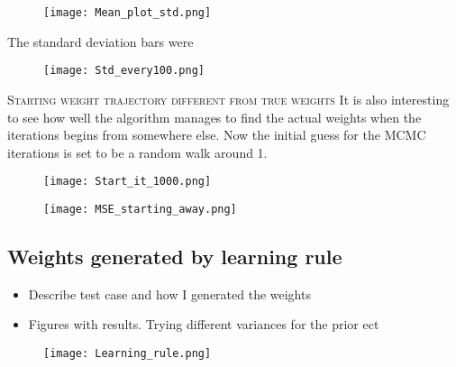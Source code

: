 \begin{figure}[hbt!]
    \centering
    \texttt{[image: Mean\_plot\_std.png]}
\end{figure}

The standard deviation bars were 

\begin{figure}[hbt!]
    \centering
    \texttt{[image: Std\_every100.png]}
\end{figure}

\textsc{Starting weight trajectory different from true weights}
It is also interesting to see how well the algorithm manages to find the actual weights when the iterations begins from somewhere else. Now the initial guess for the MCMC iterations is set to be a random walk around 1.

\begin{figure}[hbt!]
    \centering
    \texttt{[image: Start\_it\_1000.png]}
\end{figure}


\begin{figure}[hbt!]
    \centering
    \texttt{[image: MSE\_starting\_away.png]}
\end{figure}

\subsection{Weights generated by learning rule}

\begin{itemize}
    \item Describe test case and how I generated the weights
    \item Figures with results. Trying different variances for the prior ect
\end{itemize}

\begin{figure}[hbt!]
    \centering
    \texttt{[image: Learning\_rule.png]}
\end{figure}

\cleardoublepage